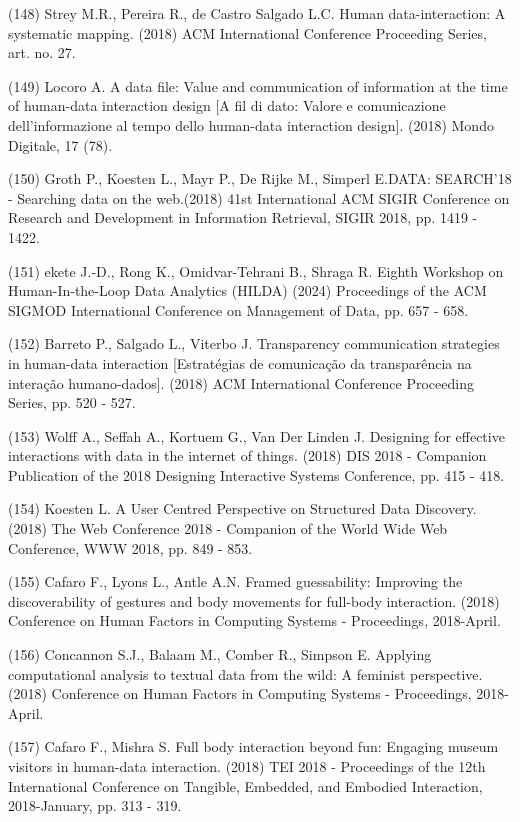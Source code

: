 \documentclass[
	12pt,				%
	oneside,			%
	a4paper,			%
	english,			%
	brazil				%
	]{abntex2ppgsi}
\begin{document}
\begin{apendicesenv}
(148) Strey M.R., Pereira R., de Castro Salgado L.C. Human data-interaction: A systematic mapping. (2018) ACM International Conference Proceeding Series, art. no. 27.

(149) Locoro A. A data file: Value and communication of information at the time of human-data interaction design [A fil di dato: Valore e comunicazione dell’informazione al tempo dello human-data interaction design]. (2018) Mondo Digitale, 17 (78).

(150) Groth P., Koesten L., Mayr P., De Rijke M., Simperl E.DATA: SEARCH'18 - Searching data on the web.(2018) 41st International ACM SIGIR Conference on Research and Development in Information Retrieval, SIGIR 2018, pp. 1419 - 1422.

(151) ekete J.-D., Rong K., Omidvar-Tehrani B., Shraga R.
Eighth Workshop on Human-In-the-Loop Data Analytics (HILDA)
(2024) Proceedings of the ACM SIGMOD International Conference on Management of Data, pp. 657 - 658.

(152) Barreto P., Salgado L., Viterbo J. Transparency communication strategies in human-data interaction [Estratégias de comunicação da transparência na interação humano-dados]. (2018) ACM International Conference Proceeding Series, pp. 520 - 527.

(153) Wolff A., Seffah A., Kortuem G., Van Der Linden J. Designing for effective interactions with data in the internet of things. (2018) DIS 2018 - Companion Publication of the 2018 Designing Interactive Systems Conference, pp. 415 - 418.

(154) Koesten L. A User Centred Perspective on Structured Data Discovery. (2018) The Web Conference 2018 - Companion of the World Wide Web Conference, WWW 2018, pp. 849 - 853.

(155) Cafaro F., Lyons L., Antle A.N. Framed guessability: Improving the discoverability of gestures and body movements for full-body interaction. (2018) Conference on Human Factors in Computing Systems - Proceedings, 2018-April.

(156) Concannon S.J., Balaam M., Comber R., Simpson E. Applying computational analysis to textual data from the wild: A feminist perspective. (2018) Conference on Human Factors in Computing Systems - Proceedings, 2018-April.

(157) Cafaro F., Mishra S. Full body interaction beyond fun: Engaging museum visitors in human-data interaction. (2018) TEI 2018 - Proceedings of the 12th International Conference on Tangible, Embedded, and Embodied Interaction, 2018-January, pp. 313 - 319.


\end{apendicesenv}
\end{document}
